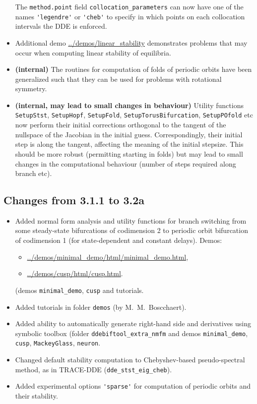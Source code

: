 \documentclass[10pt]{scrartcl}
\newcommand{\blist}[1]{\mbox{\lstinline!#1!}}
\begin{document}
\begin{itemize}
  The \blist{method.point} field \blist{collocation_parameters} can
  now have one of the names \blist{'legendre'} or \blist{'cheb'} to
  specify in which points on each collocation intervals the DDE is
  enforced.
\item Additional demo \url{../demos/linear_stability} demonstrates
  problems that may occur when computing linear stability of
  equilibria.
\item \textbf{(internal)} The routines for computation of folds of
  periodic orbits have been generalized such that they can be used for
  problems with rotational symmetry.
\item \textbf{(internal, may lead to small changes in behaviour)}
  Utility functions \blist{SetupStst}, \blist{SetupHopf},
  \blist{SetupFold}, \blist{SetupTorusBifurcation},
  \blist{SetupPOfold} etc now perform their initial corrections
  orthogonal to the tangent of the nullspace of the Jacobian in the
  initial guess. Correspondingly, their initial step is along the
  tangent, affecting the meaning of the initial stepsize. This should
  be more robust (permitting starting in folds) but may lead to small
  changes in the computational behaviour (number of steps required
  along branch etc).
\end{itemize}

\subsection{Changes from 3.1.1 to 3.2a}
\label{sec:v311to32a}
\begin{itemize}
\item Added normal form analysis and utility functions for branch
  switching from some steady-state bifurcations of codimension 2 to
  periodic orbit bifurcation of codimension 1 (for state-dependent and
  constant delays). Demos:
  \begin{itemize}
  \item \url{../demos/minimal_demo/html/minimal_demo.html},
  \item \url{../demos/cusp/html/cusp.html}.
  \end{itemize}
(demos \texttt{minimal\_demo}, \texttt{cusp} and tutorials.
\item Added tutorials in folder \texttt{demos} (by M.~M.~Boscchaert).
\item Added ability to automatically generate right-hand side and
  derivatives using symbolic toolbox (folder
  \texttt{ddebiftool\_extra\_nmfm} and demos \texttt{minimal\_demo},
  \texttt{cusp}, \texttt{MackeyGlass}, \texttt{neuron}.
\item Changed default stability computation to Chebyshev-based
  pseudo-spectral method, as in TRACE-DDE \cite{breda09}
  (\blist{dde_stst_eig_cheb}).
\item Added experimental options \blist{'sparse'} for computation of
  periodic orbits and their stability.
\end{itemize}
\end{document}
